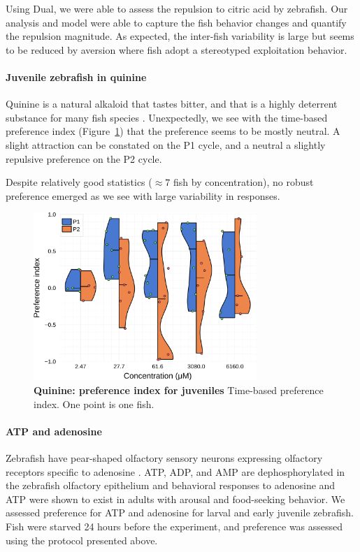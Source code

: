   Using Dual, we were able to assess the repulsion to citric acid by zebrafish. Our analysis and model were able to capture the fish behavior changes and quantify the repulsion magnitude. As expected, the inter-fish variability is large but seems to be reduced by aversion where fish adopt a stereotyped exploitation behavior.

  \paragraph{Juvenile zebrafish in quinine} Quinine is a natural alkaloid that tastes bitter, and that is a highly deterrent substance for many fish species \cite{kasumyan2003taste}. Unexpectedly, we see with the time-based preference index (Figure~\ref{dist_quinine}) that the preference seems to be mostly neutral. A slight attraction can be constated on the P1 cycle, and a neutral a slightly repulsive preference on the P2 cycle.

  Despite relatively good statistics ($\approx 7$ fish by concentration), no robust preference emerged as we see with large variability in responses.

    \begin{figure}[h!]
      \centering
      \includegraphics[width=0.75\textwidth]{part_2/assets/dist_quinine.png}
      \caption{\textbf{Quinine: preference index for juveniles} Time-based preference index. One point is one fish. }
      \label{dist_quinine}
    \end{figure}

  \paragraph{ATP and adenosine}
  Zebrafish have pear-shaped olfactory sensory neurons expressing olfactory receptors specific to adenosine \cite{wakisaka2017adenosine}. ATP, ADP, and AMP are dephosphorylated in the zebrafish olfactory epithelium \cite{wakisaka2017adenosine} and behavioral responses to adenosine and ATP were shown to exist in adults with arousal and food-seeking behavior. We assessed preference for ATP and adenosine for larval and early juvenile zebrafish. Fish were starved 24 hours before the experiment, and preference was assessed using the protocol presented above.

